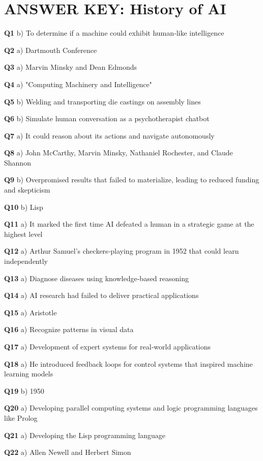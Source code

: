 \section{ANSWER KEY: History of AI}

\textbf{Q1} b) To determine if a machine could exhibit human‑like intelligence\par
\textbf{Q2} a) Dartmouth Conference\par
\textbf{Q3} a) Marvin Minsky and Dean Edmonds\par
\textbf{Q4} a) "Computing Machinery and Intelligence"\par
\textbf{Q5} b) Welding and transporting die castings on assembly lines\par
\textbf{Q6} b) Simulate human conversation as a psychotherapist chatbot\par
\textbf{Q7} a) It could reason about its actions and navigate autonomously\par
\textbf{Q8} a) John McCarthy, Marvin Minsky, Nathaniel Rochester, and Claude Shannon\par
\textbf{Q9} b) Overpromised results that failed to materialize, leading to reduced funding and skepticism\par
\textbf{Q10} b) Lisp\par
\textbf{Q11} a) It marked the first time AI defeated a human in a strategic game at the highest level\par
\textbf{Q12} a) Arthur Samuel's checkers‑playing program in 1952 that could learn independently\par
\textbf{Q13} a) Diagnose diseases using knowledge‑based reasoning\par
\textbf{Q14} a) AI research had failed to deliver practical applications\par
\textbf{Q15} a) Aristotle\par
\textbf{Q16} a) Recognize patterns in visual data\par
\textbf{Q17} a) Development of expert systems for real‑world applications\par
\textbf{Q18} a) He introduced feedback loops for control systems that inspired machine learning models\par
\textbf{Q19} b) 1950\par
\textbf{Q20} a) Developing parallel computing systems and logic programming languages like Prolog\par
\textbf{Q21} a) Developing the Lisp programming language\par
\textbf{Q22} a) Allen Newell and Herbert Simon\par
